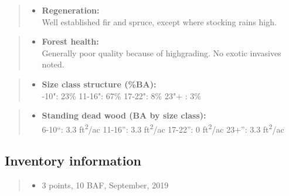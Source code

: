 \documentclass[]{tufte-handout}
\providecommand{\tightlist}{%
  \setlength{\itemsep}{0pt}\setlength{\parskip}{0pt}}
\begin{document}
\begin{quote}
\begin{itemize}
\tightlist
\item
  \textbf{Regeneration:}\\
  \vspace{2pt} Well established fir and spruce, except where stocking
  rains high.
\end{itemize}
\end{quote}

\begin{quote}
\begin{itemize}
\tightlist
\item
  \textbf{Forest health:}\\
  \vspace{2pt} Generally poor quality because of highgrading. No exotic
  invasives noted.
\end{itemize}
\end{quote}

\begin{quote}
\begin{itemize}
\tightlist
\item
  \textbf{Size class structure (\%BA):}\\
  \vspace{2pt} -10": 23\% \textbar{} 11-16": 67\% \textbar{}
  17-22": 8\% \textbar{} 23"+ : 3\%
\end{itemize}
\end{quote}

\begin{quote}
\begin{itemize}
\tightlist
\item
  \textbf{Standing dead wood (BA by size class):}\\
  \vspace{2pt} \indent \small 6-10``: 3.3 ft\textsuperscript{2}/ac
  \textbar{} 11-16'': 3.3 ft\textsuperscript{2}/ac \textbar{} 17-22'': 0
  ft\textsuperscript{2}/ac \textbar{} 23+'': 3.3
  ft\textsuperscript{2}/ac
\end{itemize}
\end{quote}

\subsection{Inventory information}\label{inventory-information-2}

\begin{quote}
\begin{itemize}
\tightlist
\item
  3 points, 10 BAF, September, 2019
\end{itemize}
\end{quote}
\end{document}
